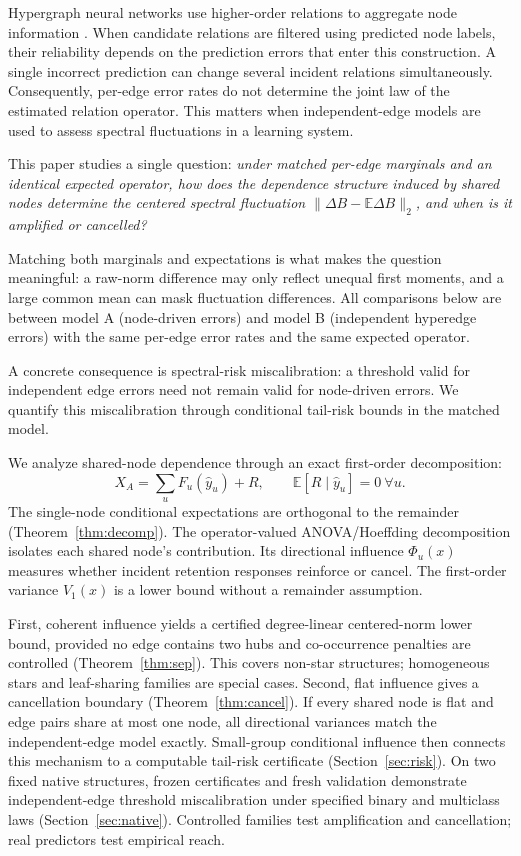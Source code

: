 \documentclass[preprint,11pt]{elsarticle}
\let\paragraph\elsparagraph
\begin{document}
Hypergraph neural networks use higher-order relations to aggregate node
information \cite{feng2019hgnn,chien2022allset}. When candidate relations
are filtered using predicted node labels, their reliability depends on
the prediction errors that enter this construction. A single incorrect
prediction can change several incident relations simultaneously.
Consequently, per-edge error rates do not determine the joint law of the
estimated relation operator. This matters when independent-edge models
are used to assess spectral fluctuations in a learning system.

This paper studies a single question: \emph{under
matched per-edge marginals and an identical expected operator, how does
the dependence structure induced by shared nodes determine the centered
spectral fluctuation $\|\Delta B-\mathbb E\Delta B\|_2$, and when is it
amplified or cancelled?}

Matching both marginals and expectations is what makes the question
meaningful: a raw-norm difference may only reflect unequal first
moments, and a large common mean can mask fluctuation differences. All
comparisons below are between model A (node-driven errors) and model B
(independent hyperedge errors) with the same per-edge error rates and
the same expected operator.

A concrete consequence is spectral-risk miscalibration: a threshold
valid for independent edge errors need not remain valid for
node-driven errors. We quantify this miscalibration through
conditional tail-risk bounds in the matched model.

We analyze shared-node dependence through an exact first-order
decomposition:
\[
X_A=\sum_u F_u(\hat y_u)+R,\qquad \mathbb E[R\mid \hat y_u]=0\ \forall u.
\]
The single-node conditional expectations are orthogonal to the
remainder (Theorem~\ref{thm:decomp}). The operator-valued
ANOVA/Hoeffding decomposition isolates each shared node's contribution.
Its directional influence $\Phi_u(x)$ measures whether incident
retention responses reinforce or cancel. The first-order variance
$V_1(x)$ is a lower bound without a remainder assumption.

\paragraph{Contributions.}
First, coherent influence yields a certified degree-linear
centered-norm lower bound, provided no edge contains two hubs and
co-occurrence penalties are controlled (Theorem~\ref{thm:sep}).
This covers non-star structures; homogeneous stars and leaf-sharing
families are special cases. Second, flat influence gives a
cancellation boundary (Theorem~\ref{thm:cancel}). If every shared
node is flat and edge pairs share at most one node, all directional
variances match the independent-edge model exactly.
Small-group conditional influence then connects this mechanism to a
computable tail-risk certificate (Section~\ref{sec:risk}). On two
fixed native structures, frozen certificates and fresh validation
demonstrate independent-edge threshold miscalibration under specified
binary and multiclass laws (Section~\ref{sec:native}). Controlled
families test amplification and cancellation; real predictors test
empirical reach.
\end{document}
